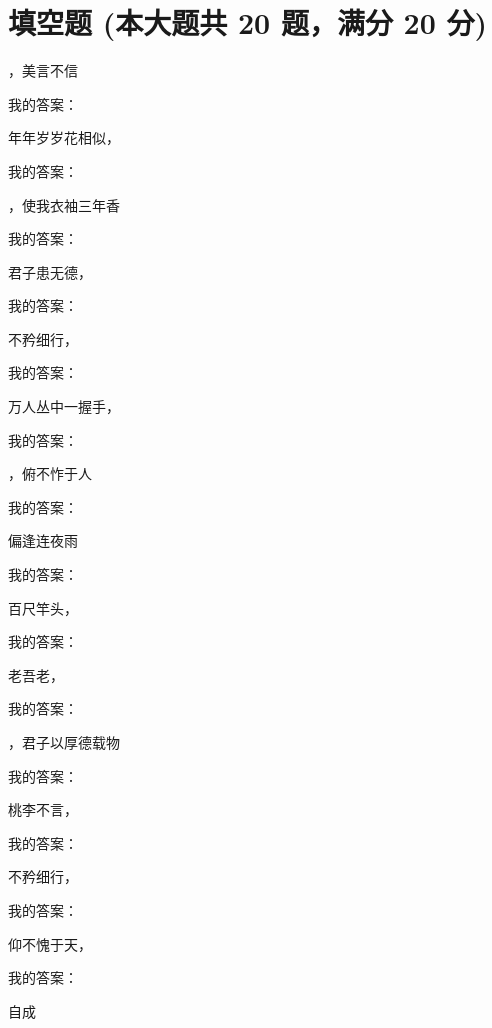 \documentclass[12pt, a4paper, addpoints]{exam}
\begin{document}
\hspace{5cm}

\section{\normalsize{填空题 (本大题共 20 题，满分 20 分)}}
\hspace{1.5cm}
\begin{multicols}{2}
\begin{questions}
\question[1] \uline{\qquad\qquad\qquad}，美言不信

我的答案：

\question[1] 年年岁岁花相似，\uline{\qquad\qquad\qquad}

我的答案：

\question[1] \uline{\qquad\qquad\qquad}，使我衣袖三年香

我的答案：

\question[1] 君子患无德，\uline{\qquad\qquad\qquad}

我的答案：

\question[1] 不矜细行，\uline{\qquad\qquad\qquad}

我的答案：

\question[1] 万人丛中一握手，\uline{\qquad\qquad\qquad}

我的答案：

\question[1] \uline{\qquad\qquad\qquad}，俯不怍于人

我的答案：

\question[1] \uline{\qquad\qquad\qquad}偏逢连夜雨

我的答案：

\question[1] 百尺竿头，\uline{\qquad\qquad\qquad}

我的答案：

\question[1] 老吾老，\uline{\qquad\qquad\qquad}

我的答案：

\question[1] \uline{\qquad\qquad\qquad}，君子以厚德载物

我的答案：

\question[1] 桃李不言，\uline{\qquad\qquad\qquad}

我的答案：

\question[1] 不矜细行，\uline{\qquad\qquad\qquad}

我的答案：

\question[1] 仰不愧于天，\uline{\qquad\qquad\qquad}

我的答案：

\question[1] 自成\uline{\qquad\qquad\qquad}


\end{questions}
\end{multicols}
\end{document}
